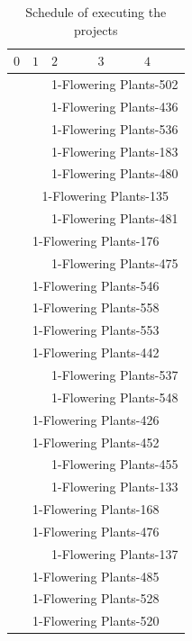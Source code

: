 \documentclass{article}
\begin{document}
\begin{table}[h!]
\centering
\caption{Schedule of executing the projects}
\label{tab:schedule}
\begin{tabular}{|p{1.8cm}|p{1.8cm}|p{1.8cm}|p{1.8cm}|p{1.8cm}|}
\hline
$0$ & $1$ & $2$ & $3$ & $4$\\
\hline\hline
& & \multicolumn{3}{c|}{1-Flowering Plants-502}\\\hline
& & \multicolumn{3}{c|}{1-Flowering Plants-436}\\\hline
& & \multicolumn{3}{c|}{1-Flowering Plants-536}\\\hline
& & \multicolumn{3}{c|}{1-Flowering Plants-183}\\\hline
& & \multicolumn{3}{c|}{1-Flowering Plants-480}\\\hline
& \multicolumn{4}{c|}{1-Flowering Plants-135}\\\hline
& & \multicolumn{3}{c|}{1-Flowering Plants-481}\\\hline
\multicolumn{5}{|c|}{1-Flowering Plants-176}\\\hline
& & \multicolumn{3}{c|}{1-Flowering Plants-475}\\\hline
\multicolumn{5}{|c|}{1-Flowering Plants-546}\\\hline
\multicolumn{5}{|c|}{1-Flowering Plants-558}\\\hline
\multicolumn{5}{|c|}{1-Flowering Plants-553}\\\hline
\multicolumn{5}{|c|}{1-Flowering Plants-442}\\\hline
& & \multicolumn{3}{c|}{1-Flowering Plants-537}\\\hline
& & \multicolumn{3}{c|}{1-Flowering Plants-548}\\\hline
\multicolumn{5}{|c|}{1-Flowering Plants-426}\\\hline
\multicolumn{5}{|c|}{1-Flowering Plants-452}\\\hline
& & \multicolumn{3}{c|}{1-Flowering Plants-455}\\\hline
& & \multicolumn{3}{c|}{1-Flowering Plants-133}\\\hline
\multicolumn{5}{|c|}{1-Flowering Plants-168}\\\hline
\multicolumn{5}{|c|}{1-Flowering Plants-476}\\\hline
& & \multicolumn{3}{c|}{1-Flowering Plants-137}\\\hline
\multicolumn{5}{|c|}{1-Flowering Plants-485}\\\hline
\multicolumn{5}{|c|}{1-Flowering Plants-528}\\\hline
\multicolumn{5}{|c|}{1-Flowering Plants-520}\\\hline

\end{tabular}
\end{table}
\end{document}
